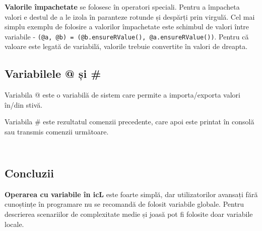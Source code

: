{\bf Valorile împachetate} se folosesc în operatori speciali. Pentru a împacheta valori e destul de a le izola în paranteze rotunde și despărți prin virgulă. Cel mai simplu exemplu de folosire a valorilor împachetate este schimbul de valori între variabile - \texttt{(@a, @b) = (@b.ensureRValue(), @a.ensureRValue())}. Pentru că valoare este legată de variabilă, valorile trebuie convertite în valori de dreapta.

\subsection{Variabilele @ și \#}

{Variabila @} este o variabilă de sistem care permite a importa/exporta valori în/din stivă. 

{Variabila \#} este rezultatul comenzii precedente, care apoi este printat în consolă sau transmis comenzii următoare.


\begin{sourcecode}
    \label{globalvars}
    \inputminted[linenos]{icl}{../sources/globalvars.icL}
\end{sourcecode}

\begin{sourcecode}
    \label{rlvalues}
    \inputminted[linenos]{icl}{../sources/rlvalues.icL}
\end{sourcecode}

\subsection{Concluzii}

{\bf Operarea cu variabile în icL} este foarte simplă, dar utilizatorilor avansați fără cunoștințe în programare nu se recomandă de folosit variabile globale. Pentru descrierea scenariilor de complexitate medie și joasă pot fi folosite doar variabile locale.
